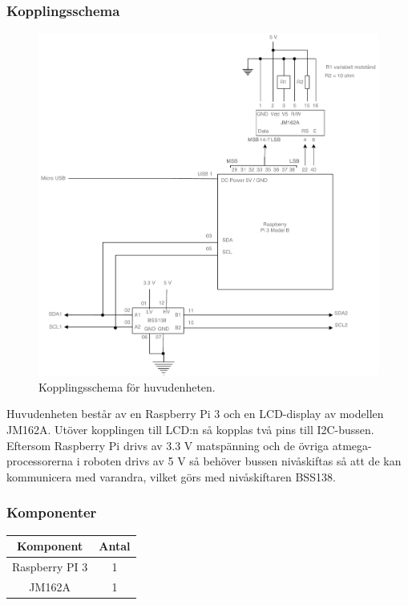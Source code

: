 \documentclass{article}
\begin{document}
\subsubsection{Kopplingsschema}

\begin{figure}[H]
\centering
\includegraphics[scale=0.45]{Huvudenhet_kopplingsschema}
\caption{Kopplingsschema för huvudenheten.}
\label{fig:huvudenhet_kopplingsschema}
\end{figure}

Huvudenheten består av en Raspberry Pi 3 och en LCD-display av modellen JM162A. Utöver kopplingen till LCD:n så kopplas två pins till I2C-bussen. Eftersom Raspberry Pi drivs av 3.3 V matspänning och de övriga atmega-processorerna i roboten drivs av 5 V så behöver bussen nivåskiftas så att de kan kommunicera med varandra, vilket görs med nivåskiftaren BSS138.

\subsubsection{Komponenter}

\begin{table}[H]
   \centering
  \begin{tabular}{ | c | c | }
    \hline
    \textbf{Komponent} & \textbf{Antal} \\
    \hline
    Raspberry PI 3 & 1 \\
    \hline
    JM162A & 1 \\
    \hline
  \end{tabular}
\end{table}
\end{document}
